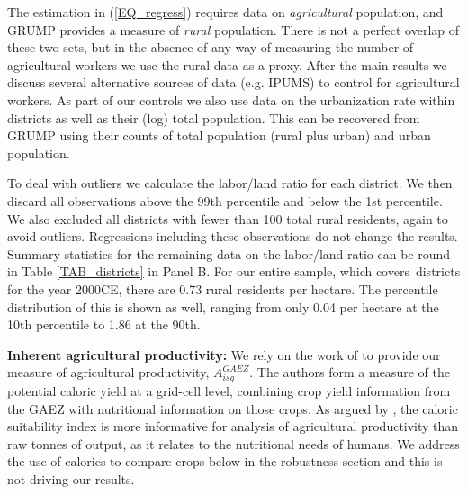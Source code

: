 \documentclass[11pt]{article}
\begin{document}
The estimation in (\ref{EQ_regress}) requires data on \textit{agricultural} population, and GRUMP provides a measure of \textit{rural} population. There is not a perfect overlap of these two sets, but in the absence of any way of measuring the number of agricultural workers we use the rural data as a proxy. After the main results we discuss several alternative sources of data (e.g. IPUMS) to control for agricultural workers. As part of our controls we also use data on the urbanization rate within districts as well as their (log) total population. This can be recovered from GRUMP using their counts of total population (rural plus urban) and urban population.

To deal with outliers we calculate the labor/land ratio for each district. We then discard all observations above the 99th percentile and below the 1st percentile. We also excluded all districts with fewer than 100 total rural residents, again to avoid outliers. Regressions including these observations do not change the results. Summary statistics for the remaining data on the labor/land ratio can be round in Table \ref{TAB_districts} in Panel B. For our entire sample, which covers\districts \ districts for the year 2000CE, there are 0.73 rural residents per hectare. The percentile distribution of this is shown as well, ranging from only 0.04 per hectare at the 10th percentile to 1.86 at the 90th. 

\vspace{.5cm}\noindent\textbf{Inherent agricultural productivity:} We rely on the work of \citet{galorozak2016} to provide our measure of agricultural productivity, $A^{GAEZ}_{isg}$. The authors form a measure of the potential caloric yield at a grid-cell level, combining crop yield information from the GAEZ with nutritional information on those crops. As argued by \citet{galorozak2016}, the caloric suitability index is more informative for analysis of agricultural productivity than raw tonnes of output, as it relates to the nutritional needs of humans. We address the use of calories to compare crops below in the robustness section and this is not driving our results.
\end{document}
